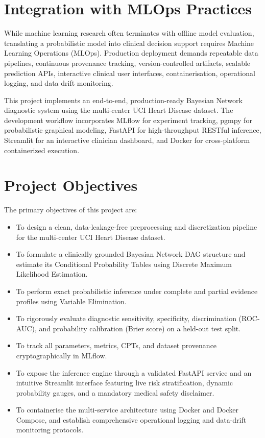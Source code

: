 \documentclass[12pt,a4paper]{report}
\begin{document}
\section{Integration with MLOps Practices}

While machine learning research often terminates with offline model evaluation, translating a probabilistic model into clinical decision support requires Machine Learning Operations (MLOps). Production deployment demands repeatable data pipelines, continuous provenance tracking, version-controlled artifacts, scalable prediction APIs, interactive clinical user interfaces, containerisation, operational logging, and data drift monitoring.

This project implements an end-to-end, production-ready Bayesian Network diagnostic system using the multi-center UCI Heart Disease dataset. The development workflow incorporates MLflow for experiment tracking, pgmpy for probabilistic graphical modeling, FastAPI for high-throughput RESTful inference, Streamlit for an interactive clinician dashboard, and Docker for cross-platform containerized execution.

\section{Project Objectives}

The primary objectives of this project are:
\begin{itemize}
\item To design a clean, data-leakage-free preprocessing and discretization pipeline for the multi-center UCI Heart Disease dataset.
\item To formulate a clinically grounded Bayesian Network DAG structure and estimate its Conditional Probability Tables using Discrete Maximum Likelihood Estimation.
\item To perform exact probabilistic inference under complete and partial evidence profiles using Variable Elimination.
\item To rigorously evaluate diagnostic sensitivity, specificity, discrimination (ROC-AUC), and probability calibration (Brier score) on a held-out test split.
\item To track all parameters, metrics, CPTs, and dataset provenance cryptographically in MLflow.
\item To expose the inference engine through a validated FastAPI service and an intuitive Streamlit interface featuring live risk stratification, dynamic probability gauges, and a mandatory medical safety disclaimer.
\item To containerise the multi-service architecture using Docker and Docker Compose, and establish comprehensive operational logging and data-drift monitoring protocols.
\end{itemize}
\end{document}
